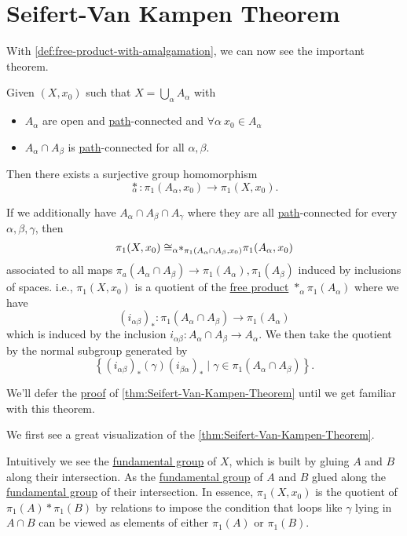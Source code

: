 \section{Seifert-Van Kampen Theorem}
With \autoref{def:free-product-with-amalgamation}, we can now see the important theorem.
\begin{theorem}\label{thm:Seifert-Van-Kampen-Theorem}
	Given \((X, x_0)\) such that \(X = \bigcup\limits_{\alpha } A_{\alpha }\) with
	\begin{itemize}
		\item \(A_{\alpha }\) are open and \hyperref[def:path]{path}-connected and \(\forall \alpha \ x_0\in A_{\alpha }\)
		\item \(A_{\alpha }\cap A_{\beta }\) is \hyperref[def:path]{path}-connected for all \(\alpha, \beta  \).
	\end{itemize}
	Then there exists a surjective group homomorphism
	\[
		\underset{\alpha }{\ast}\colon \pi _1(A_{\alpha }, x_0)\to \pi _1(X, x_0).
	\]

	\par If we additionally have \(A_{\alpha }\cap A_{\beta}\cap A_{\gamma}\) where they are all \hyperref[def:path]{path}-connected for every \(\alpha , \beta , \gamma\), then
	\[
		\pi _1(X, x_0)\cong _{\alpha }\hspace{-0.3em}\ast_{\pi _1(A_{\alpha }\cap A_{\beta }, x_0)}{}\pi _1(A_{\alpha }, x_0)
	\]
	associated to all maps \(\pi _a(A_{\alpha }\cap A_{\beta }) \to \pi _1 (A_{\alpha }), \pi _1(A_{\beta })\) induced by inclusions of spaces. i.e., \(\pi _1(X, x_0)\)
	is a quotient of the \hyperref[def:free-product-with-amalgamation]{free product} \(\ast_{\alpha}\pi _1(A_{\alpha })\) where we have
	\[
		(i_{\alpha \beta })_\ast\colon \pi _1(A_{\alpha }\cap A_{\beta })\to \pi _1(A_\alpha )
	\]
	which is induced by the inclusion \(i_{\alpha \beta }\colon A_{\alpha}\cap A_{\beta }\to A_{\alpha }\). We then take the quotient by the normal subgroup generated by
	\[
		\left\{(i_{\alpha \beta })_{\ast}(\gamma)(i_{\beta \alpha })_{\ast} \mid \gamma\in \pi _1(A_{\alpha }\cap A_{\beta })\right\}.
	\]
\end{theorem}
We'll defer the \hyperref[pf:thm:Seifert-Van-Kampen-Theorem]{proof} of \autoref{thm:Seifert-Van-Kampen-Theorem} until we get familiar with this theorem.
\begin{eg}
	We first see a great visualization of the \autoref{thm:Seifert-Van-Kampen-Theorem}.
	\begin{figure}[H]
		\centering
		\label{fig:eg:Seifert-Van-Kampen-Theorem}
	\end{figure}
	Intuitively we see the \hyperref[def:fundamental-group]{fundamental group} of \(X\), which is built by gluing \(A\) and \(B\) along their intersection.
	As the \hyperref[def:fundamental-group]{fundamental group} of \(A\) and \(B\) glued along the \hyperref[def:fundamental-group]{fundamental group} of their
	intersection. In essence, \(\pi _1 (X, x_0)\) is the quotient of \(\pi _1(A)\ast \pi _1(B)\) by relations to impose the condition that loops like \(\gamma \)
	lying in \(A\cap B\) can be viewed as elements of either \(\pi _1(A)\) or \(\pi _1(B)\).
\end{eg}

